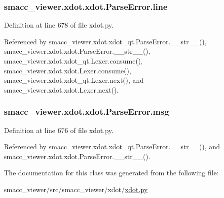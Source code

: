 \subsubsection[{\texorpdfstring{line}{line}}]{\setlength{\rightskip}{0pt plus 5cm}smacc\+\_\+viewer.\+xdot.\+xdot.\+Parse\+Error.\+line}\hypertarget{classsmacc__viewer_1_1xdot_1_1xdot_1_1ParseError_a505ce84cf3c75c01a0f33854ffbefe74}{}\label{classsmacc__viewer_1_1xdot_1_1xdot_1_1ParseError_a505ce84cf3c75c01a0f33854ffbefe74}


Definition at line 678 of file xdot.\+py.



Referenced by smacc\+\_\+viewer.\+xdot.\+xdot\+\_\+qt.\+Parse\+Error.\+\_\+\+\_\+str\+\_\+\+\_\+(), smacc\+\_\+viewer.\+xdot.\+xdot.\+Parse\+Error.\+\_\+\+\_\+str\+\_\+\+\_\+(), smacc\+\_\+viewer.\+xdot.\+xdot\+\_\+qt.\+Lexer.\+consume(), smacc\+\_\+viewer.\+xdot.\+xdot.\+Lexer.\+consume(), smacc\+\_\+viewer.\+xdot.\+xdot\+\_\+qt.\+Lexer.\+next(), and smacc\+\_\+viewer.\+xdot.\+xdot.\+Lexer.\+next().

\subsubsection[{\texorpdfstring{msg}{msg}}]{\setlength{\rightskip}{0pt plus 5cm}smacc\+\_\+viewer.\+xdot.\+xdot.\+Parse\+Error.\+msg}\hypertarget{classsmacc__viewer_1_1xdot_1_1xdot_1_1ParseError_a66bf73a283893791d4e586bfc7846c64}{}\label{classsmacc__viewer_1_1xdot_1_1xdot_1_1ParseError_a66bf73a283893791d4e586bfc7846c64}


Definition at line 676 of file xdot.\+py.



Referenced by smacc\+\_\+viewer.\+xdot.\+xdot\+\_\+qt.\+Parse\+Error.\+\_\+\+\_\+str\+\_\+\+\_\+(), and smacc\+\_\+viewer.\+xdot.\+xdot.\+Parse\+Error.\+\_\+\+\_\+str\+\_\+\+\_\+().



The documentation for this class was generated from the following file\+:\begin{DoxyCompactItemize}
\item 
smacc\+\_\+viewer/src/smacc\+\_\+viewer/xdot/\hyperlink{xdot_8py}{xdot.\+py}\end{DoxyCompactItemize}
